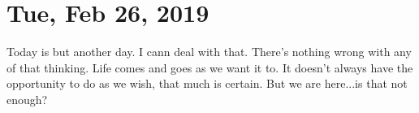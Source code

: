 \section{Tue, Feb 26, 2019}

Today is but another day. I cann deal with that. There's nothing
wrong with any of that thinking. Life comes and goes as we want
it to. It doesn't always have the opportunity to do as we wish,
that much is certain. But we are here...is that not enough?

